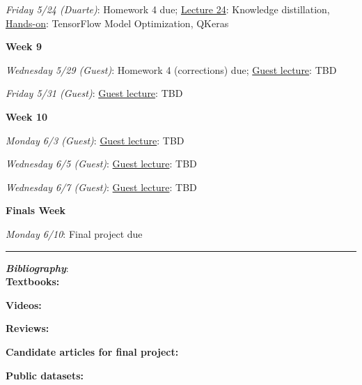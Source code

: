 \documentclass[12pt]{article}
\begin{document}
\emph{Friday 5/24 (Duarte)}: Homework 4 due; \underline{Lecture 24}: Knowledge distillation, \underline{Hands-on}: TensorFlow Model Optimization, QKeras

\noindent\textbf{Week 9}

\emph{Wednesday 5/29 (Guest)}: Homework 4 (corrections) due;  \underline{Guest lecture}: TBD

\emph{Friday 5/31 (Guest)}:  \underline{Guest lecture}: TBD

\noindent\textbf{Week 10}

\emph{Monday 6/3 (Guest)}: \underline{Guest lecture}: TBD

\emph{Wednesday 6/5 (Guest)}: \underline{Guest lecture}: TBD

\emph{Wednesday 6/7 (Guest)}: \underline{Guest lecture}: TBD

\noindent\textbf{Finals Week}

\emph{Monday 6/10}: Final project due

\begin{center}
	\rule{\textwidth}{0.5pt}
\end{center}

\noindent\textbf{\emph{Bibliography}}:\\

\textbf{Textbooks:}

\newrefsection
\nocite{Mehta:2019,Abu-Mostafa:2012,Erdman:2021,Zeljko:2014,Calafiura:2022,Chollet:2021}
\printbibliography[heading=none]

\textbf{Videos:}

\newrefsection
\nocite{3blue1brown_neuralnetwork,3blue1brown_gradientdescent}
\printbibliography[heading=none]

\textbf{Reviews:}

\newrefsection
\nocite{Carleo:2019ptp,hepmllivingreview}
\printbibliography[heading=none]

\textbf{Candidate articles for final project:}

\newrefsection
\nocite{deOliveira:2015xxd,Aurisano:2016jvx,Komiske:2016rsd,Khan:2018opv,Zhou:2019,Moreno:2019neq,Ormiston:2020ele,Moreno:2021fvp,Erdmann:2019nie,Guest:2016iqz}
\printbibliography[heading=none]

\textbf{Public datasets:}

\newrefsection
\nocite{kasieczka_gregor_2019_2603256,hbb_dataset,galaxy-zoo-the-galaxy-challenge,g2net-gravitational-wave-detection,trackml-particle-identification}
\printbibliography[heading=none]
\end{document}
